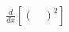 \documentclass[preview]{standalone}
\begin{document}
\begin{align*}
\frac{d}{dx} \left[ ( \quad ) ^2 \right]
\end{align*}
\end{document}
